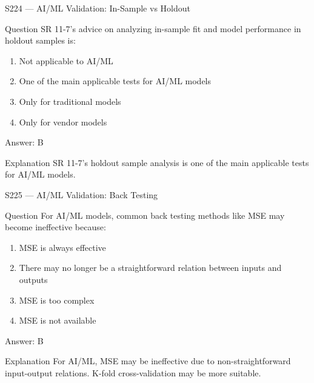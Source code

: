 \documentclass[aspectratio=169,8pt]{beamer}
\begin{document}
	\begin{frame}{S224 --- AI/ML Validation: In-Sample vs Holdout}
		\begin{block}{Question}
			SR 11-7's advice on analyzing in-sample fit and model performance in holdout samples is:
			\begin{enumerate}
				\item Not applicable to AI/ML
				\item One of the main applicable tests for AI/ML models
				\item Only for traditional models
				\item Only for vendor models
			\end{enumerate}
		\end{block}
		\begin{exampleblock}{Answer: B}\end{exampleblock}
		\begin{block}{Explanation}
			SR 11-7's holdout sample analysis is one of the main applicable tests for AI/ML models.
		\end{block}
	\end{frame}
	
	\begin{frame}{S225 --- AI/ML Validation: Back Testing}
		\begin{block}{Question}
			For AI/ML models, common back testing methods like MSE may become ineffective because:
			\begin{enumerate}
				\item MSE is always effective
				\item There may no longer be a straightforward relation between inputs and outputs
				\item MSE is too complex
				\item MSE is not available
			\end{enumerate}
		\end{block}
		\begin{exampleblock}{Answer: B}\end{exampleblock}
		\begin{block}{Explanation}
			For AI/ML, MSE may be ineffective due to non-straightforward input-output relations. K-fold cross-validation may be more suitable.
		\end{block}
	\end{frame}
	
\end{document}
